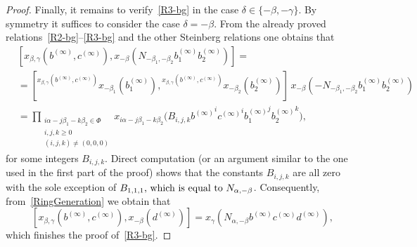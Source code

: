 \documentclass{article}
\numberwithin{equation}{section}
\theoremstyle{definition}
\theoremstyle{remark}
\newcommand{\up}[2]{{^{#1}\!{#2}}}
\begin{document}
\begin{proof}
 Finally, it remains to verify~\eqref{R3-bg} in the case $\delta \in \{-\beta, -\gamma\}$.
 By symmetry it suffices to consider the case $\delta = -\beta$.
 From the already proved relations~\eqref{R2-bg}--\eqref{R3-bg} and the other Steinberg relations one obtains that
 \begin{align*}
  &[x_{\beta, \gamma}(b^{(\infty)}, c^{(\infty)}),
  x_{-\beta}(N_{-\beta_1, -\beta_2} b_1^{(\infty)} b_2^{(\infty)})] = \\
  &= [\up{x_{\beta, \gamma}(b^{(\infty)}, c^{(\infty)})}
   {x_{-\beta_1}(b_1^{(\infty)})},
  \up{x_{\beta, \gamma}(b^{(\infty)}, c^{(\infty)})}
   {x_{-\beta_2}(b_2^{(\infty)})}]\,
  x_{-\beta}(-N_{-\beta_1, -\beta_2} b_1^{(\infty)} b_2^{(\infty)})\\
  &= \prod_{\substack{i\alpha - j\beta_1 - k\beta_2 \in \Phi\\ i, j, k \geq 0\\ (i, j, k) \neq (0, 0, 0)}}
  x_{i\alpha - j\beta_1 - k\beta_2}\bigl(B_{i, j, k} {b^{(\infty)}}^i {c^{(\infty)}}^i {b_1^{(\infty)}}^j {b_2^{(\infty)}}^k\bigr),  
 \end{align*}
for some integers $B_{i,j,k}$.
Direct computation (or an argument similar to the one used in the first part of the proof) shows that the constants \(B_{i, j, k}\) are all zero with the sole exception of \(B_{1, 1, 1}$, which is equal to $N_{\alpha, -\beta}\). Consequently, from~\cref{RingGeneration} we obtain that
 \[[x_{\beta, \gamma}(b^{(\infty)}, c^{(\infty)}), x_{-\beta}(d^{(\infty)})] = x_\gamma(N_{\alpha, -\beta} b^{(\infty)} c^{(\infty)} d^{(\infty)}),\]
which finishes the proof of~\eqref{R3-bg}.
\end{proof}
\end{document}
